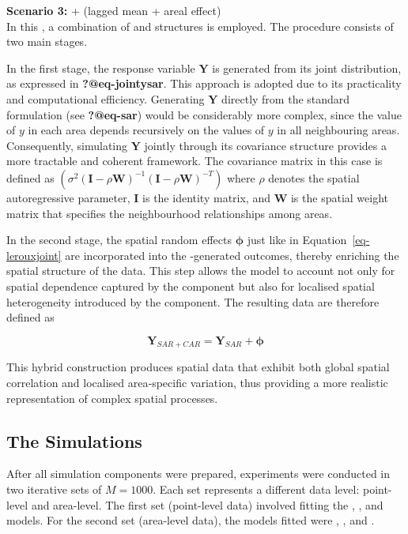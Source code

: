 \documentclass[
  letterpaper,
  DIV=11,
  numbers=noendperiod]{scrartcl}
\begin{document}
\textbf{Scenario 3:}  +   (lagged mean +
areal effect)\\
In this , a combination of  and  structures
is employed. The procedure consists of two main stages.

In the first stage, the response variable \(\mathbf{Y}\) is generated
from its joint distribution, as expressed in \textbf{?@eq-jointysar}.
This approach is adopted due to its practicality and computational
efficiency. Generating \(\mathbf{Y}\) directly from the standard
 formulation (see \textbf{?@eq-sar}) would be considerably more
complex, since the value of \(y\) in each area depends recursively on
the values of \(y\) in all neighbouring areas. Consequently, simulating
\(\mathbf{Y}\) jointly through its covariance structure provides a more
tractable and coherent framework. The covariance matrix in this case is
defined as
\((\sigma^2 (\mathbf{I} - \rho \mathbf{W})^{-1} (\mathbf{I} - \rho \mathbf{W})^{-T})\)
where \(\rho\) denotes the spatial autoregressive parameter,
\(\mathbf{I}\) is the identity matrix, and \(\mathbf{W}\) is the spatial
weight matrix that specifies the neighbourhood relationships among
areas.

In the second stage, the spatial random effects \(\boldsymbol{\phi}\)
just like in Equation~\ref{eq-lerouxjoint} are incorporated into the
‐generated outcomes, thereby enriching the spatial structure of
the data. This step allows the model to account not only for spatial
dependence captured by the  component but also for localised
spatial heterogeneity introduced by the  component. The
resulting data are therefore defined as

\[
\mathbf{Y}_{SAR+CAR} = \mathbf{Y}_{SAR} + \boldsymbol{\phi}
\]

This hybrid construction produces spatial data that exhibit both global
spatial correlation and localised area‐specific variation, thus
providing a more realistic representation of complex spatial processes.

\subsection{The Simulations}\label{simulations}

After all simulation components were prepared, experiments were
conducted in two iterative sets of \(M = 1000\). Each set represents a
different data level: point-level and area-level. The first set
(point-level data) involved fitting the , , and
 models. For the second set (area-level data), the models
fitted were , , and .
\end{document}
